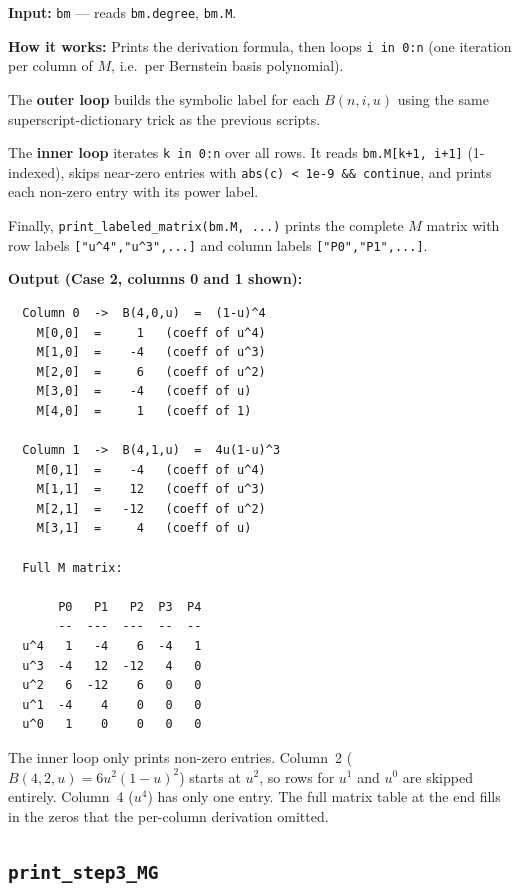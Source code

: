 \documentclass[12pt, a4paper]{article}
\newcommand{\cd}[1]{\texttt{#1}}
\begin{document}
\textbf{Input:} \cd{bm} --- reads \cd{bm.degree}, \cd{bm.M}.

\textbf{How it works:}
Prints the derivation formula, then loops \cd{i in 0:n}
(one iteration per column of $M$, i.e.\ per Bernstein basis polynomial).

The \textbf{outer loop} builds the symbolic label for each
$B(n,i,u)$ using the same superscript-dictionary trick
as the previous scripts.

The \textbf{inner loop} iterates \cd{k in 0:n} over all rows.
It reads \cd{bm.M[k+1, i+1]} (1-indexed), skips
near-zero entries with \cd{abs(c) < 1e-9 \&\& continue},
and prints each non-zero entry with its power label.

Finally, \cd{print\_labeled\_matrix(bm.M, ...)} prints the
complete $M$ matrix with row labels \cd{["u\^{}4","u\^{}3",...]}
and column labels \cd{["P0","P1",...]}.

\textbf{Output (Case 2, columns 0 and 1 shown):}
\begin{verbatim}
  Column 0  ->  B(4,0,u)  =  (1-u)^4
    M[0,0]  =     1   (coeff of u^4)
    M[1,0]  =    -4   (coeff of u^3)
    M[2,0]  =     6   (coeff of u^2)
    M[3,0]  =    -4   (coeff of u)
    M[4,0]  =     1   (coeff of 1)

  Column 1  ->  B(4,1,u)  =  4u(1-u)^3
    M[0,1]  =    -4   (coeff of u^4)
    M[1,1]  =    12   (coeff of u^3)
    M[2,1]  =   -12   (coeff of u^2)
    M[3,1]  =     4   (coeff of u)

  Full M matrix:

       P0   P1   P2  P3  P4
       --  ---  ---  --  --
  u^4   1   -4    6  -4   1
  u^3  -4   12  -12   4   0
  u^2   6  -12    6   0   0
  u^1  -4    4    0   0   0
  u^0   1    0    0   0   0
\end{verbatim}

\begin{notebox}
The inner loop only prints non-zero entries.
Column~2 ($B(4,2,u) = 6u^2(1-u)^2$) starts at $u^2$,
so rows for $u^1$ and $u^0$ are skipped entirely.
Column~4 ($u^4$) has only one entry.
The full matrix table at the end fills in the zeros
that the per-column derivation omitted.
\end{notebox}

\subsection{\texttt{print\_step3\_MG}}
\end{document}
